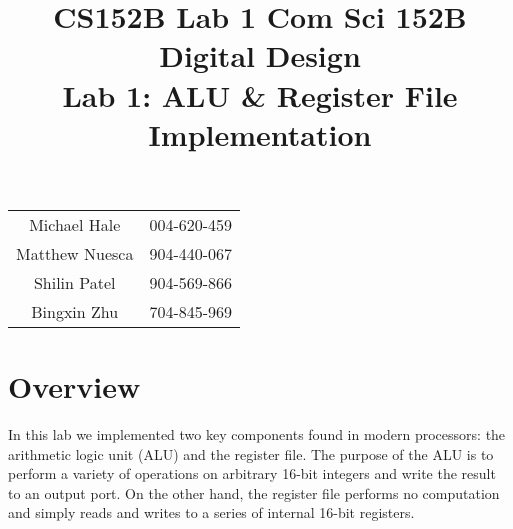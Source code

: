 \documentclass[11pt]{article}
\title{CS152B Lab 1}
\begin{document}
	
\title{\vspace{-0.5in} Com Sci 152B Digital Design \\
	Lab 1: ALU \& Register File Implementation }
\date{}
\maketitle
\vspace{-0.75in}
\begin{center}
\begin{tabular}{cc}
	Michael Hale & 004-620-459 \\ 
	Matthew Nuesca & 904-440-067 \\ 
	Shilin Patel & 904-569-866 \\ 
	Bingxin Zhu & 704-845-969
\end{tabular}
\end{center}

\section*{Overview}

In this lab we implemented two key components found in modern processors: the arithmetic logic unit (ALU) and the register file. The purpose of the ALU is to perform a variety of operations on arbitrary 16-bit integers and write the result to an output port. On the other hand, the register file performs no computation and simply reads and writes to a series of internal 16-bit registers. 

\end{document}
